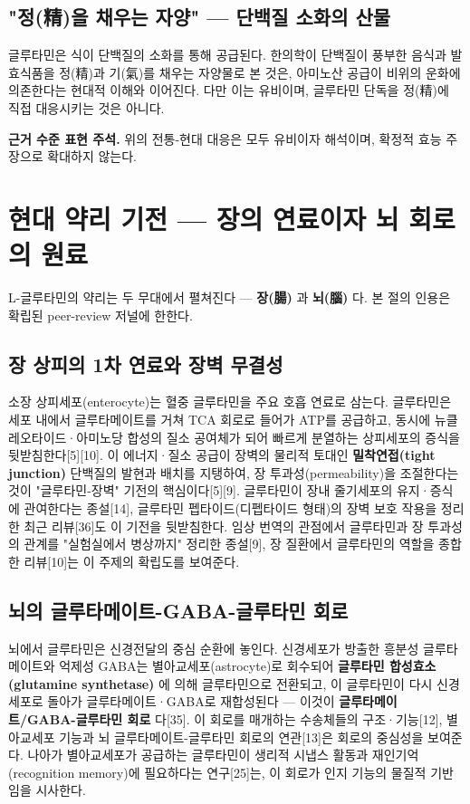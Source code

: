 \documentclass[11pt,oneside]{book}
\newenvironment{authnote}
  {\par\smallskip\begingroup\leftskip=7mm\rightskip=5mm\small\color{muted}\noindent\ignorespaces}
  {\par\endgroup\smallskip}
\begin{document}
\subsection{"정(精)을 채우는 자양" — 단백질 소화의 산물}
글루타민은 식이 단백질의 소화를 통해 공급된다. 한의학이 단백질이 풍부한 음식과 발효식품을 정(精)과 기(氣)를 채우는 자양물로 본 것은, 아미노산 공급이 비위의 운화에 의존한다는 현대적 이해와 이어진다. 다만 이는 유비이며, 글루타민 단독을 정(精)에 직접 대응시키는 것은 아니다.

\begin{authnote}\textbf{근거 수준 표현 주석.} 위의 전통-현대 대응은 모두 유비이자 해석이며, 확정적 효능 주장으로 확대하지 않는다.\end{authnote}
\section{현대 약리 기전 — 장의 연료이자 뇌 회로의 원료}
L-글루타민의 약리는 두 무대에서 펼쳐진다 — \textbf{장(腸)} 과 \textbf{뇌(腦)} 다. 본 절의 인용은 확립된 peer-review 저널에 한한다.

\subsection{장 상피의 1차 연료와 장벽 무결성}
소장 상피세포(enterocyte)는 혈중 글루타민을 주요 호흡 연료로 삼는다. 글루타민은 세포 내에서 글루타메이트를 거쳐 TCA 회로로 들어가 ATP를 공급하고, 동시에 뉴클레오타이드·아미노당 합성의 질소 공여체가 되어 빠르게 분열하는 상피세포의 증식을 뒷받침한다[5][10]. 이 에너지·질소 공급이 장벽의 물리적 토대인 \textbf{밀착연접(tight junction)} 단백질의 발현과 배치를 지탱하여, 장 투과성(permeability)을 조절한다는 것이 "글루타민-장벽" 기전의 핵심이다[5][9]. 글루타민이 장내 줄기세포의 유지·증식에 관여한다는 종설[14], 글루타민 펩타이드(디펩타이드 형태)의 장벽 보호 작용을 정리한 최근 리뷰[36]도 이 기전을 뒷받침한다. 임상 번역의 관점에서 글루타민과 장 투과성의 관계를 "실험실에서 병상까지" 정리한 종설[9], 장 질환에서 글루타민의 역할을 종합한 리뷰[10]는 이 주제의 확립도를 보여준다.

\subsection{뇌의 글루타메이트-GABA-글루타민 회로}
뇌에서 글루타민은 신경전달의 중심 순환에 놓인다. 신경세포가 방출한 흥분성 글루타메이트와 억제성 GABA는 별아교세포(astrocyte)로 회수되어 \textbf{글루타민 합성효소(glutamine synthetase)} 에 의해 글루타민으로 전환되고, 이 글루타민이 다시 신경세포로 돌아가 글루타메이트·GABA로 재합성된다 — 이것이 \textbf{글루타메이트/GABA-글루타민 회로} 다[35]. 이 회로를 매개하는 수송체들의 구조·기능[12], 별아교세포 기능과 뇌 글루타메이트-글루타민 회로의 연관[13]은 회로의 중심성을 보여준다. 나아가 별아교세포가 공급하는 글루타민이 생리적 시냅스 활동과 재인기억(recognition memory)에 필요하다는 연구[25]는, 이 회로가 인지 기능의 물질적 기반임을 시사한다.
\end{document}
